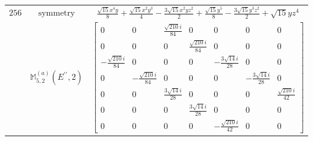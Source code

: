 \documentclass[fleqn,8pt,landscape]{jsarticle}
\begin{document}
\begin{longtable}{ccc}
$ 256 $ & $ \text{symmetry} $ & $ \frac{\sqrt{15} x^{4} y}{8} + \frac{\sqrt{15} x^{2} y^{3}}{4} - \frac{3 \sqrt{15} x^{2} y z^{2}}{2} + \frac{\sqrt{15} y^{5}}{8} - \frac{3 \sqrt{15} y^{3} z^{2}}{2} + \sqrt{15} y z^{4} $ \\
$  $ & $ \mathbb{M}_{5,2}^{(a)}(E^{\prime\prime},2) $ & $ \begin{bmatrix} 0 & 0 & \frac{\sqrt{210} i}{84} & 0 & 0 & 0 & 0 \\ 0 & 0 & 0 & \frac{\sqrt{210} i}{84} & 0 & 0 & 0 \\ - \frac{\sqrt{210} i}{84} & 0 & 0 & 0 & - \frac{3 \sqrt{14} i}{28} & 0 & 0 \\ 0 & - \frac{\sqrt{210} i}{84} & 0 & 0 & 0 & - \frac{3 \sqrt{14} i}{28} & 0 \\ 0 & 0 & \frac{3 \sqrt{14} i}{28} & 0 & 0 & 0 & \frac{\sqrt{210} i}{42} \\ 0 & 0 & 0 & \frac{3 \sqrt{14} i}{28} & 0 & 0 & 0 \\ 0 & 0 & 0 & 0 & - \frac{\sqrt{210} i}{42} & 0 & 0 \end{bmatrix} $ \\ \hline
\end{longtable}
\end{document}
